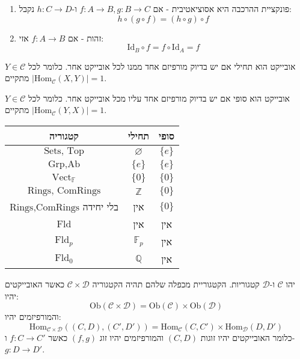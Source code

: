 \documentclass{tstextbook}
\begin{document}
\begin{enumerate}
  \item פונקציית ההרכבה היא אסוציאטיבית - אם \(f:A\to B,g:B\to C\)  ו-\(h:C\to D\) נקבל: 
$$h\circ (g\circ  f)=(h\circ  g)\circ  f$$


  \item זהות - אם \(f:A\to B\) אזי: 
$$\mathrm{Id}_{B}\circ  f=f \circ  \mathrm{Id}_{A}=f$$


\end{enumerate}
\begin{definition}
אובייקט הוא תחילי אם יש בדיוק מורפיזם אחד ממנו לכל אובייקט אחר. כלומר לכל \(Y \in \mathcal{C}\) מתקיים \(\left\lvert  \mathrm{Hom}_{\mathcal{C}}(X,Y)  \right\rvert=1\).

\end{definition}
\begin{definition}
אובייקט הוא סופי אם יש בדיוק מורפיזם אחד עליו מכל אובייקט אחר. כלומר לכל \(Y \in \mathcal{C}\) מתקיים \(\left\lvert  \mathrm{Hom}_{\mathcal{C}}(Y,X)  \right\rvert=1\).

\end{definition}
\begin{example}
  \begin{table}[htbp]
    \centering
    \begin{tabular}{|ccc|}
      \hline
      קטגוריה & תחילי & סופי \\ \hline
      \(\text{Sets, Top}\) & \(\varnothing\) & \(\{ e \}\) \\ \hline
      \(\text{Grp,Ab}\) & \(\{ e \}\) & \(\{ e \}\) \\ \hline
      \(\text{Vect}_{\mathbb{F}}\) & \(\{ 0 \}\) & \(\{ 0 \}\) \\ \hline
      \(\text{Rings, ComRings}\) & \(\mathbb{Z}\) & \(\{ 0 \}\) \\ \hline
      \(\text{Rings,ComRings}\) בלי יחידה & אין & \(\{ 0 \}\) \\ \hline
      \(\text{Fld}\) & אין & אין \\ \hline
      \(\text{Fld}_{p}\) & \(\mathbb{F}_{p}\) & אין \\ \hline
      \(\text{Fld}_{0}\) & \(\mathbb{Q}\) & אין \\ \hline
    \end{tabular}
  \end{table}
\end{example}
\begin{definition}
יהו \(\mathcal{C}\) ו-\(\mathcal{D}\) קטגוריות. הקטגוריית מכפלה שלהם תהיה הקטגוריה \(\mathcal{C}\times \mathcal{D}\) כאשר האובייקטים יהיו:
$$\mathrm{Ob}\left( \mathcal{C} \times \mathcal{D}  \right)=\mathrm{Ob}\left( \mathcal{C}  \right)\times \mathrm{Ob}\left( \mathcal{D}  \right)$$
והמורפיזמים יהיו:
$$\mathrm{Hom}_{\mathcal{C} \times \mathcal{D} }((C,D),(C',D')) =\mathrm{Hom}_{\mathcal{C} }(C,C')\times \mathrm{Hom}_{\mathcal{D} }(D,D')$$
כלומר האובייקטים יהיו זוגות \((C,D)\) והמורפיזמים יהיו זוג \((f,g)\) כאשר \(f:C\to C'\) ו-\(g:D\to D'\).

\end{definition}
\end{document}
